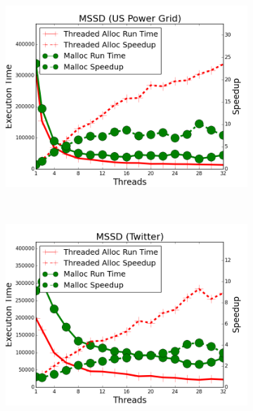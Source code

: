 \begin{figure}[h]
\begin{subfigure}[b]{\smallplotsize\textwidth}
                \includegraphics[width=\textwidth]{experiments/scalability/malloc-allocator-shortest-uspowergrid.png}
                \label{fig:implementation:malloc_sssp}
        \end{subfigure}
        ~
        \begin{subfigure}[b]{\smallplotsize\textwidth}
                \includegraphics[width=\textwidth]{experiments/scalability/malloc-allocator-shortest-twitter.png}
                \label{fig:implementation:malloc_sssp}
        \end{subfigure}\\
        \begin{subfigure}[b]{\smallplotsize\textwidth}

\end{subfigure}
\end{figure}
